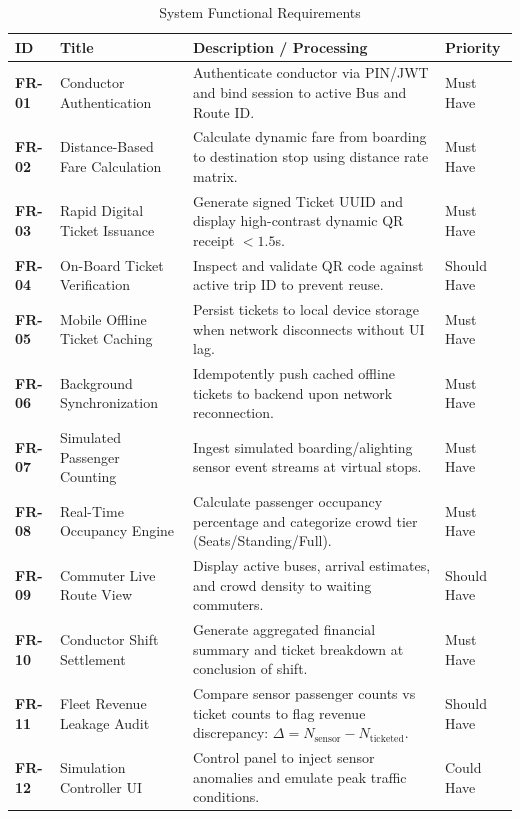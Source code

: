 \documentclass[11pt,a4paper]{article}
\begin{document}
\begin{table}[h]
\centering
\small
\renewcommand{\arraystretch}{1.2}
\begin{tabularx}{\textwidth}{@{}l p{4.5cm} X l@{}}
\toprule
\textbf{ID} & \textbf{Title} & \textbf{Description / Processing} & \textbf{Priority} \\
\midrule
\textbf{FR-01} & Conductor Authentication & Authenticate conductor via PIN/JWT and bind session to active Bus and Route ID. & Must Have \\
\textbf{FR-02} & Distance-Based Fare Calculation & Calculate dynamic fare from boarding to destination stop using distance rate matrix. & Must Have \\
\textbf{FR-03} & Rapid Digital Ticket Issuance & Generate signed Ticket UUID and display high-contrast dynamic QR receipt $< 1.5$s. & Must Have \\
\textbf{FR-04} & On-Board Ticket Verification & Inspect and validate QR code against active trip ID to prevent reuse. & Should Have \\
\textbf{FR-05} & Mobile Offline Ticket Caching & Persist tickets to local device storage when network disconnects without UI lag. & Must Have \\
\textbf{FR-06} & Background Synchronization & Idempotently push cached offline tickets to backend upon network reconnection. & Must Have \\
\textbf{FR-07} & Simulated Passenger Counting & Ingest simulated boarding/alighting sensor event streams at virtual stops. & Must Have \\
\textbf{FR-08} & Real-Time Occupancy Engine & Calculate passenger occupancy percentage and categorize crowd tier (Seats/Standing/Full). & Must Have \\
\textbf{FR-09} & Commuter Live Route View & Display active buses, arrival estimates, and crowd density to waiting commuters. & Should Have \\
\textbf{FR-10} & Conductor Shift Settlement & Generate aggregated financial summary and ticket breakdown at conclusion of shift. & Must Have \\
\textbf{FR-11} & Fleet Revenue Leakage Audit & Compare sensor passenger counts vs ticket counts to flag revenue discrepancy: $\Delta = N_{\text{sensor}} - N_{\text{ticketed}}$. & Should Have \\
\textbf{FR-12} & Simulation Controller UI & Control panel to inject sensor anomalies and emulate peak traffic conditions. & Could Have \\
\bottomrule
\end{tabularx}
\caption{System Functional Requirements}
\end{table}
\end{document}
